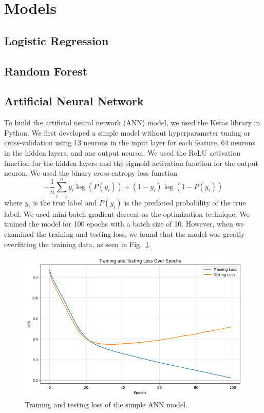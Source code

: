 \section{Models}

\subsection{Logistic Regression}

\subsection{Random Forest}

\subsection{Artificial Neural Network}

To build the artificial neural network (ANN) model, we used the Keras library in Python. We first developed a simple model without hyperparameter tuning or cross-validation using 13 neurons in the input layer for each feature, 64 neurons in the hidden layers, and one output neuron. We used the ReLU activation function for the hidden layers and the sigmoid activation function for the output neuron. We used the binary cross-entropy loss function 
\[
-\frac{1}{n}\sum_{i=1}^{n}y_i \log (P(y_i)) + (1 - y_i) \log (1 - P(y_i))
\]
where \(y_i\) is the true label and \(P(y_i)\) is the predicted probability of the true label.
We used mini-batch gradient descent as the optimization technique. We trained the model for 100 epochs with a batch size of 10. However, when we examined the training and testing loss, we found that the model was greatly overfitting the training data, as seen in Fig.~\ref{annoverfitting}. 

\begin{figure}[htbp]
    \centerline{\includegraphics[scale=0.435]{img/annoverfitting.png}}
    \caption{Training and testing loss of the simple ANN model.}\label{annoverfitting}
\end{figure}

